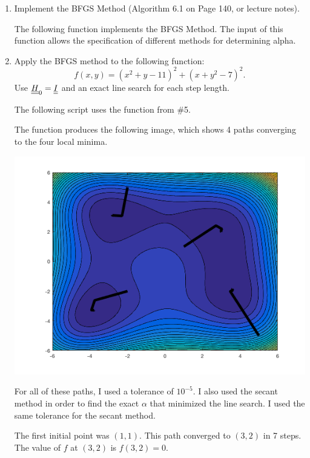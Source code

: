 \documentclass[11pt, oneside]{article}
\begin{document}
\begin{enumerate}
\begin{proof}
      Thus $A^{1/2}$ satisfies all the criterion for the square root of the
      matrix $A$.
    \end{proof}

  \item %
    Implement the BFGS Method (Algorithm 6.1 on Page 140, or lecture notes).

    The following function implements the BFGS Method.
    The input of this function allows the specification of different methods
    for determining alpha.
    

  \item %
    Apply the BFGS method to the following function:
    \[
      f(x, y) = (x^2 + y - 11)^2 + (x + y^2 - 7)^2.
    \]
    Use $\underline{\underline{H}}_0 = \underline{\underline{I}}$ and an exact line search for each step length.

    The following script uses the function from \#5.
    

    The function produces the following image, which shows 4 paths converging to the
    four local minima.
    \begin{center}
      \includegraphics[scale=.7]{Figures/04_1}
    \end{center}

    For all of these paths, I used a tolerance of $10^{-5}$.
    I also used the secant method in order to find the exact $\alpha$ that
    minimized the line search.
    I used the same tolerance for the secant method.

    The first initial point was $(1, 1)$. 
    This path converged to $(3, 2)$ in 7 steps. 
    The value of $f$ at $(3, 2)$ is $f(3, 2) = 0$.


\end{enumerate}
\end{document}
